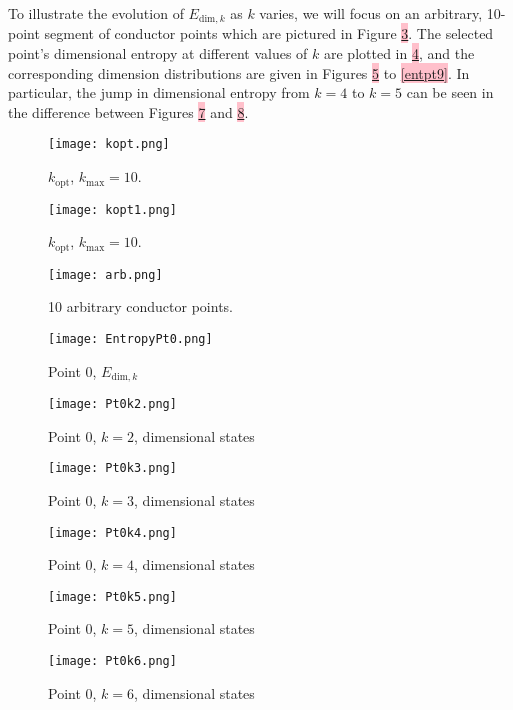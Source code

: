 \documentclass[a4paper,11pt,twoside]{article}
\theoremstyle{definition}
\theoremstyle{remark}
\newcommand{\sh}[1]{\colorbox{pink}{#1}}
\newcommand{\lnk}[1]{\sh{\hyperref[#1]{\ref*{#1}}}}
\begin{document}
To illustrate the evolution of $E_{\mathrm{dim},k}$ as $k$ varies, we will focus on an arbitrary, 10-point segment of conductor points which are pictured in Figure \lnk{arb}. The selected point's dimensional entropy at different values of $k$ are plotted in \lnk{diment0}, and the corresponding dimension distributions are given in Figures \lnk{entpt2} to \lnk{entpt9}. In particular, the jump in dimensional entropy from $k=4$ to $k=5$ can be seen in the difference between Figures \lnk{entpt4} and \lnk{entpt5}.
\newpage  
\begin{figure}[!h]
  \caption{$k_\mathrm{opt}$, $k_\mathrm{max}=10$.}
  \centering
    \texttt{[image: kopt.png]}
    \label{kopt}
\end{figure}

\begin{figure}[!h]
  \caption{$k_\mathrm{opt}$, $k_\mathrm{max}=10$.}
  \centering
    \texttt{[image: kopt1.png]}
    \label{kopt1}
\end{figure}
\newpage
\begin{figure}[!h]
  \caption{10 arbitrary conductor points.}
  \centering
    \texttt{[image: arb.png]}
    \label{arb}
\end{figure}
\begin{figure}[!h]
  \caption{Point 0, $E_{\mathrm{dim},k}$}
  \centering
    \texttt{[image: EntropyPt0.png]}
    \label{diment0}
\end{figure}
\newpage
\begin{figure}[!h]
  \caption{Point 0, $k=2$, dimensional states}
  \centering
    \texttt{[image: Pt0k2.png]}
    \label{entpt2}
\end{figure}
\begin{figure}[!h]
  \caption{Point 0, $k=3$, dimensional states}
  \centering
    \texttt{[image: Pt0k3.png]}
    \label{entpt3}
\end{figure}
\newpage 
\begin{figure}[!h]
  \caption{Point 0, $k=4$, dimensional states}
  \centering
    \texttt{[image: Pt0k4.png]}
    \label{entpt4}
\end{figure}
\begin{figure}[!h]
  \caption{Point 0, $k=5$, dimensional states}
  \centering
    \texttt{[image: Pt0k5.png]}
    \label{entpt5}
\end{figure}
\newpage 
\begin{figure}[!h]
  \caption{Point 0, $k=6$, dimensional states}
  \centering
    \texttt{[image: Pt0k6.png]}
    \label{entpt6}
\end{figure}
\end{document}
